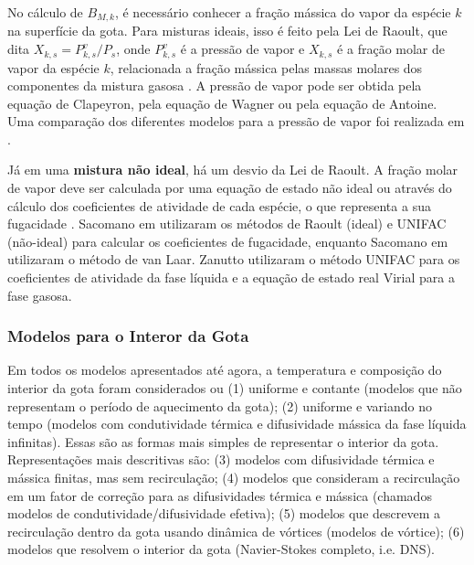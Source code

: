 No cálculo de $B_{M,k}$, é necessário conhecer a fração mássica do vapor da espécie $k$ na superfície da gota.
Para misturas ideais, isso é feito pela Lei de Raoult, que dita $X_{k,s}=P^v_{k,s}/P_s$, onde $P^v_{k,s}$ é a pressão de vapor e $X_{k,s}$ é a fração molar de vapor da espécie $k$, relacionada a fração mássica pelas massas molares dos componentes da mistura gasosa \cite{Peters2010}.
A pressão de vapor pode ser obtida pela equação de Clapeyron, pela equação de Wagner ou pela equação de Antoine.
Uma comparação dos diferentes modelos para a pressão de vapor foi realizada em \cite{SacomanoF2019IJHMT}.

Já em uma \textbf{mistura não ideal}, há um desvio da Lei de Raoult. 
A fração molar de vapor deve ser calculada por uma equação de estado não ideal ou através do cálculo dos coeficientes de atividade de cada espécie, o que representa a sua fugacidade \cite{Bird2002}.
Sacomano\etal{} em \cite{SacomanoF2022IJHMT} utilizaram os métodos de Raoult (ideal) e UNIFAC (não-ideal) para calcular os coeficientes de fugacidade, enquanto Sacomano\etal{} em \cite{SacomanoF2025CF} utilizaram o método de van Laar.
Zanutto\etal{} \cite{ZanuttoC2019} utilizaram o método UNIFAC para os coeficientes de atividade da fase líquida e a equação de estado real Virial para a fase gasosa.


\subsubsection{Modelos para o Interor da Gota} \label{sec:int}

Em todos os modelos apresentados até agora, a temperatura e composição do interior da gota foram considerados ou (1) uniforme e contante (modelos que não representam o período de aquecimento da gota); (2) uniforme e variando no tempo (modelos com condutividade térmica e difusividade mássica da fase líquida infinitas).
Essas são as formas mais simples de representar o interior da gota.
Representações mais descritivas são: (3) modelos com difusividade térmica e mássica finitas, mas sem recirculação; (4) modelos que consideram a recirculação em um fator de correção para as difusividades térmica e mássica (chamados modelos de condutividade/difusividade efetiva); (5) modelos que descrevem a recirculação dentro da gota usando dinâmica de vórtices (modelos de vórtice); (6) modelos que resolvem o interior da gota (Navier-Stokes completo, i.e. DNS). \cite{Sazhin2006}

